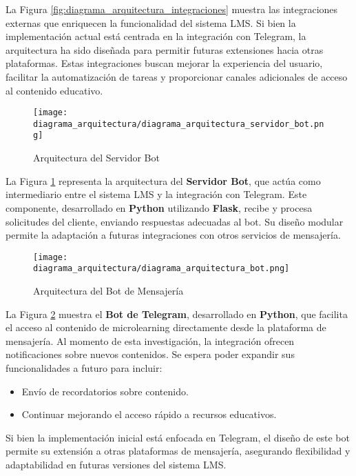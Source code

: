 La Figura \ref{fig:diagrama_arquitectura_integraciones} muestra las
integraciones externas que enriquecen la funcionalidad del sistema LMS. Si bien
la implementación actual está centrada en la integración con Telegram, la
arquitectura ha sido diseñada para permitir futuras extensiones hacia otras
plataformas. Estas integraciones buscan mejorar la experiencia del usuario,
facilitar la automatización de tareas y proporcionar canales adicionales de
acceso al contenido educativo.

\begin{figure}[htbp]
    \centering
    \texttt{[image: diagrama\_arquitectura/diagrama\_arquitectura\_servidor\_bot.png]}
    \caption{Arquitectura del Servidor Bot}
    \label{fig:diagrama_arquitectura_servidor_bot}
\end{figure}

La Figura \ref{fig:diagrama_arquitectura_servidor_bot} representa la
arquitectura del \textbf{Servidor Bot}, que actúa como intermediario entre el
sistema LMS y la integración con Telegram. Este componente, desarrollado en
\textbf{Python} utilizando \textbf{Flask}, recibe y procesa solicitudes del
cliente, enviando respuestas adecuadas al bot. Su diseño modular permite la
adaptación a futuras integraciones con otros servicios de mensajería.

\begin{figure}[htbp]
    \centering
    \texttt{[image: diagrama\_arquitectura/diagrama\_arquitectura\_bot.png]}
    \caption{Arquitectura del Bot de Mensajería}
    \label{fig:diagrama_arquitectura_bot}
\end{figure}

La Figura \ref{fig:diagrama_arquitectura_bot} muestra el \textbf{Bot de
Telegram}, desarrollado en \textbf{Python}, que facilita el acceso al contenido
de microlearning directamente desde la plataforma de mensajería.
Al momento de esta investigación, la integración ofrecen notificaciones sobre nuevos contenidos.
Se espera poder expandir sus funcionalidades a futuro para incluir:
\begin{itemize}
    \item Envío de recordatorios sobre contenido.
    \item Continuar mejorando el acceso rápido a recursos educativos.
\end{itemize}

Si bien la implementación inicial está enfocada en Telegram, el diseño de este
bot permite su extensión a otras plataformas de mensajería, asegurando
flexibilidad y adaptabilidad en futuras versiones del sistema LMS.





